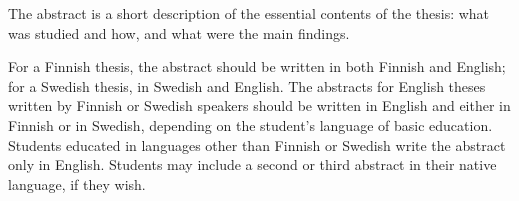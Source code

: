 \documentclass[finnish, 12pt, a4paper, arts, utf8, a-2b, online]{aaltothesis}
\begin{document}

\newpage
\date{21 September 2023}
\begin{abstractpage}[english]
The abstract is a short description of the essential contents of the thesis: 
what was studied and how, and what were the main findings.

For a Finnish thesis, the abstract should be written in both Finnish and 
English; for a Swedish thesis, in Swedish and English. The abstracts for 
English theses written by Finnish or Swedish speakers should be written in 
English and either in Finnish or in Swedish, depending on the student’s language 
of basic education. Students educated in languages other than Finnish or Swedish 
write the abstract only in English. Students may include a second or third 
abstract in their native language, if they wish.
\end{abstractpage}
\end{document}

